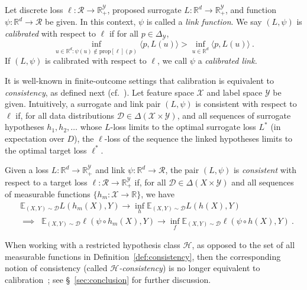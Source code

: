 \documentclass[twoside,11pt]{article}
\newcommand{\reals}{\mathbb{R}}
\newcommand{\prop}[1]{\mathrm{prop}[#1]}
\newcommand{\simplex}{\Delta_\Y}
\newcommand{\D}{\mathcal{D}}
\newcommand{\E}{\mathbb{E}}
\renewcommand{\H}{\mathcal{H}}
\newcommand{\R}{\mathcal{R}}
\newcommand{\X}{\mathcal{X}}
\newcommand{\Y}{\mathcal{Y}}
\newcommand{\inprod}[2]{\langle #1, #2 \rangle}%
\begin{document}
\begin{definition}
  \label{def:calibrated}
  Let discrete loss $\ell:\R\to\reals^\Y_+$, proposed surrogate $L:\reals^d\to\reals^\Y_+$, and function $\psi:\reals^d\to\R$ be given.
  In this context, $\psi$ is called a \emph{link function}.
  We say $(L,\psi)$ is \emph{calibrated} with respect to $\ell$ if
for all $p \in \simplex$,
  \begin{equation}
    \label{eq:calibrated}
  \inf_{u \in \reals^d : \psi(u) \not\in \prop{\ell}(p)} \inprod{p}{L(u)} > \inf_{u \in \reals^d} \inprod{p}{L(u)}~.
  \end{equation}
  If $(L, \psi)$ is calibrated with respect to $\ell$, we call $\psi$ a \emph{calibrated link.}
\end{definition}


It is well-known in finite-outcome settings that calibration is equivalent to \emph{consistency}, as defined next (cf.~\citep{bartlett2006convexity,zhang2004statistical,agarwal2015consistent}).
Let feature space $\X$ and label space $\Y$ be given.
Intuitively, a surrogate and link pair $(L,\psi)$ is consistent with respect to $\ell$ if, for all data distributions $\D \in \Delta(\X \times \Y)$, and all sequences of surrogate hypotheses $h_1,h_2,\ldots$ whose $L$-loss limits to the optimal surrogate loss $L^*$ (in expectation over $D$), the $\ell$-loss of the sequence the linked hypotheses limits to the optimal target loss $\ell^*$.

\begin{definition}\label{def:consistency}
	Given a loss $L : \reals^d \to \reals^\Y_+$ and link $\psi : \reals^d \to \R$, the pair $(L, \psi)$ is \emph{consistent} with respect to a target loss $\ell : \R \to \reals^\Y_+$ if, for all $\D \in \Delta(X \times \Y)$ and all sequences of measurable functions $\{h_m : \X \to \reals\}$, we have
	\begin{align*}
		&\E_{(X,Y) \sim \D} L(h_m(X), Y) \to \inf_h  \E_{(X,Y) \sim \D} L(h(X), Y)
    \\
    &\implies \;\; \E_{(X,Y) \sim \D} \ell(\psi \circ h_m(X), Y) \to \inf_f  \E_{(X,Y) \sim \D} \ell(\psi \circ h(X), Y)~.
	\end{align*}
\end{definition}

When working with a restricted hypothesis class $\H$, as opposed to the set of all measurable functions in Definition~\ref{def:consistency}, then the corresponding notion of consistency (called \emph{$\H$-consistency}) is no longer equivalent to calibration~\citep{long2013consistency,kuznetov2014multiclass,zhang2020convex};
see \S~\ref{sec:conclusion} for further discussion.
\end{document}
